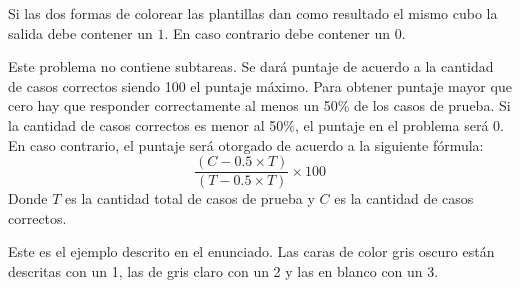 \documentclass{oci}
\begin{document}
\begin{outputDescription}
  Si las dos formas de colorear las plantillas dan como resultado el mismo cubo la salida debe
  contener un $1$.
  En caso contrario debe contener un $0$.
\end{outputDescription}

\begin{scoreDescription}
  Este problema no contiene subtareas.
  Se dará puntaje de acuerdo a la cantidad de casos correctos siendo 100 el puntaje máximo.
  Para obtener puntaje mayor que cero hay que responder correctamente al menos un 50\%
  de los casos de prueba.
  Si la cantidad de casos correctos es menor al 50\%, el puntaje en el problema será 0.
  En caso contrario, el puntaje será otorgado de acuerdo a la siguiente fórmula:
  $$\frac{(C - 0.5\times T)}{(T - 0.5\times T)}\times 100$$
  Donde $T$ es la cantidad total de casos de prueba y $C$ es la cantidad de casos correctos.
\end{scoreDescription}

\begin{sampleDescription}
\vspace{-1em}
    Este es el ejemplo descrito en el enunciado.
    Las caras de color gris oscuro están descritas con un 1, las de gris claro con un 2 y las en
    blanco con un 3.
\vspace{1em}

\end{sampleDescription}
\end{document}
